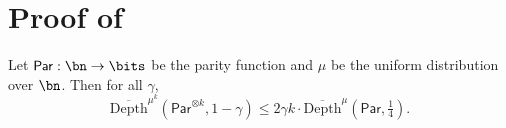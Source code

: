 \documentclass[11pt]{article}
\begin{document}




\section{Proof of~}



\begin{claim} 
    \label{claim:linear-dependence}
    Let $\mathsf{Par} : \bn\to\bits$ be the parity function and $\mu $ be the uniform distribution over $\bn$. Then for all $\gamma$,
    \[
\overline{\mathrm{Depth}}^{\mu^k}(\mathsf{Par}^{\otimes k}, 1 -\gamma) \leq2 \gamma k \cdot \overline{\mathrm{Depth}}^\mu(\mathsf{Par}, \tfrac1{4}).
    \]
\end{claim}
\end{document}
